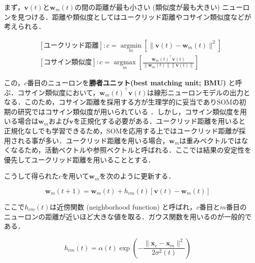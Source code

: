 まず，$\mathbf{v}(t)$と$\mathbf{w}_m(t)$の間の距離が最も小さい (類似度が最も大きい) ニューロンを見つける．距離や類似度としてはユークリッド距離やコサイン類似度などが考えられる．


\begin{align}
&[\text{ユークリッド距離}]: c = \underset{m}{\operatorname{argmin}}\left[\|\mathbf{v}(t)-\mathbf{w}_m(t)\|^2\right]\\
&[\text{コサイン類似度}]: c  = \underset{m}{\operatorname{argmax}}\left[\frac{\mathbf{w}_m(t)^\top\mathbf{v}(t)}{\|\mathbf{w}_m(t)\|\|\mathbf{v}(t)\|}\right]
\end{align}


この，$c$番目のニューロンを\textbf{勝者ユニット(best matching unit; BMU)} と呼ぶ．コサイン類似度において，$\mathbf{w}_m(t)^\top\mathbf{v}(t)$は線形ニューロンモデルの出力となる．このため，コサイン距離を採用する方が生理学的に妥当でありSOMの初期の研究ではコサイン類似度が用いられている \cite{Kohonen1982-mn}．しかし，コサイン類似度を用いる場合は$\mathbf{w}_m$および$\mathbf{v}$を正規化する必要がある．ユークリッド距離を用いると正規化なしでも学習できるため，SOMを応用する上ではユークリッド距離が採用される事が多い．ユークリッド距離を用いる場合，$\mathbf{w}_m$は重みベクトルではなくなるため，活動ベクトルや参照ベクトルと呼ばれる．ここでは結果の安定性を優先してユークリッド距離を用いることとする．

こうして得られた$c$を用いて$\mathbf{w}_m$を次のように更新する．


\begin{equation}
\mathbf{w}_m(t+1)=\mathbf{w}_m(t)+h_{cm}(t)[\mathbf{v}(t)-\mathbf{w}_m(t)]
\end{equation}


ここで$h_{cm}(t)$は近傍関数 (neighborhood function) と呼ばれ，$c$番目と$m$番目のニューロンの距離が近いほど大きな値を取る．ガウス関数を用いるのが一般的である．


\begin{equation}
h_{cm}(t)=\alpha(t)\exp\left(-\frac{\|\mathbf{x}_c-\mathbf{x}_m\|^2}{2\sigma^2(t)}\right)
\end{equation}



